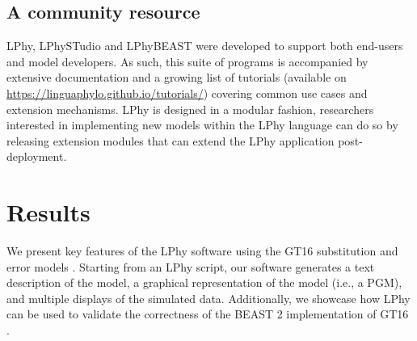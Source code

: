 \documentclass[10pt,letterpaper,table]{article}
\theoremstyle{definition}
\begin{document}
\subsection{A community resource}
LPhy, LPhySTudio and LPhyBEAST were developed to support both end-users and model developers.
As such, this suite of programs is accompanied by extensive documentation and a growing list of tutorials (available on \url{https://linguaphylo.github.io/tutorials/}) covering common use cases and extension mechanisms. 
LPhy is designed in a modular fashion, researchers interested in implementing new models within the LPhy language can do so by releasing extension modules that can extend the LPhy application post-deployment.



\section{Results}
We present key features of the LPhy software using the GT16 substitution and error models \cite{kozlov2022cellphy}. 
Starting from an LPhy script, our software generates a text description of the model, a graphical representation of the model (i.e., a PGM), and multiple displays of the simulated data. 
Additionally, we showcase how LPhy can be used to validate the correctness of the BEAST 2 implementation of GT16 \cite{chen2022accounting}. 
\end{document}
